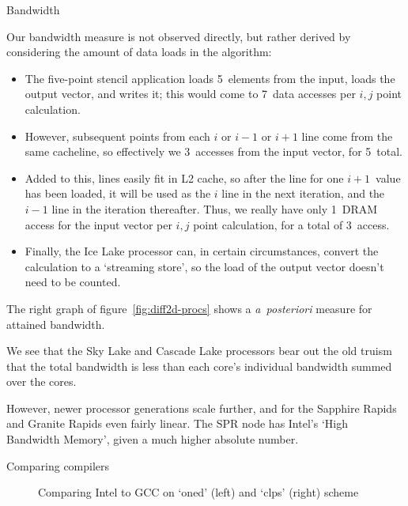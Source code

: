  {Bandwidth}

Our bandwidth measure is not observed directly, but
rather derived by considering the amount of data loads
in the algorithm:
\begin{itemize}
\item The five-point stencil application loads 5~elements from the input,
  loads the output vector, and writes it; this would come to 7~data accesses per
  $i,j$ point calculation.
\item However, subsequent points from each $i$ or $i-1$ or $i+1$ line
  come from the same cacheline, so effectively we 3~accesses from the input vector,
  for 5~total.
\item Added to this, lines easily fit in L2 cache, so after the line for one
  $i+1$~value has been loaded, it will be used as the $i$ line
  in the next iteration, and the $i-1$ line in the iteration thereafter.
  Thus, we really have only 1~DRAM access for the input vector per $i,j$ point calculation,
  for a total of 3~access.
\item Finally, the Ice Lake processor can, in certain circumstances,
  convert the calculation to a `streaming store', so the load of the output vector
  doesn't need to be counted.
\end{itemize}

The right graph of figure~\ref{fig:diff2d-procs} shows a \emph{a~posteriori}
measure for attained bandwidth.


We see that the Sky Lake and Cascade Lake processors bear out the
old truism that the total bandwidth is less than 
each core's individual bandwidth summed over the cores.

However, newer processor generations scale further, and
for the Sapphire Rapids and Granite Rapids even fairly linear.
The SPR node has Intel's `High Bandwidth Memory',
given a much higher absolute number.

 {Comparing compilers}

\begin{figure*}[t]
  \begingroup %
  
  
  \endgroup %
  \caption{Comparing Intel to GCC on `oned' (left) and `clps' (right) scheme}
  \label{fig:compiler-compare-oned}
\end{figure*}

